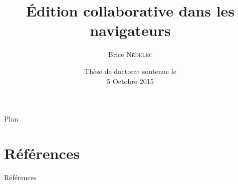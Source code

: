 \documentclass[10pt, xcolor={usenames, dvipsnames}]{beamer}
\title{Édition collaborative dans les navigateurs}
\author{Brice \textsc{N\'edelec}}
\institute{\normalsize{Université de Nantes, LINA}}
\date{Thèse de doctorat soutenue le\\5 Octobre 2015}
\begin{document}
  \begin{frame}
    \titlepage
  \end{frame}

  

  \begin{frame}{Plan}
    \tableofcontents
  \end{frame}



  
  
%  

  
  
  \section*{Références}
  \begin{frame}[allowframebreaks]{Références}
    \def\newblock{\hskip .11em plus .33em minus .07em}
    
    
  \end{frame}
  
\end{document}
